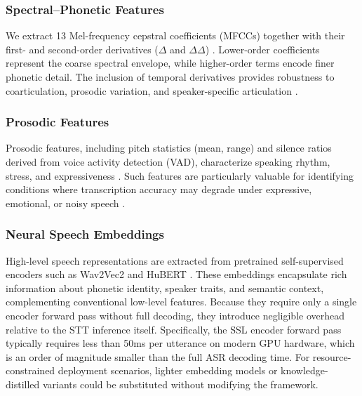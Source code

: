 \documentclass[journal]{IEEEtran}
\begin{document}
    \subsubsection{Spectral–Phonetic Features}
    We extract 13 Mel-frequency cepstral coefficients (MFCCs) together with their
    first- and second-order derivatives ($\Delta$ and $\Delta\Delta$)
    \cite{davis1980mfcc,furui1986deltas}. Lower-order coefficients represent the
    coarse spectral envelope, while higher-order terms encode finer phonetic
    detail. The inclusion of temporal derivatives provides robustness to coarticulation,
    prosodic variation, and speaker-specific articulation \cite{rabiner1993fundamentals}.

    \subsubsection{Prosodic Features}
    Prosodic features, including pitch statistics (mean, range) and silence ratios
    derived from voice activity detection (VAD), characterize speaking rhythm, stress,
    and expressiveness \cite{sohn1999vad}. Such features are particularly
    valuable for identifying conditions where transcription accuracy may degrade
    under expressive, emotional, or noisy speech \cite{li2023emotionalasr}.

    \subsubsection{Neural Speech Embeddings}
    High-level speech representations are extracted from pretrained self-supervised
    encoders such as Wav2Vec2 and HuBERT \cite{baevski2020wav2vec,hsu2021hubert}.
    These embeddings encapsulate rich information about phonetic identity, speaker
    traits, and semantic context, complementing conventional low-level features.
    Because they require only a single encoder forward pass without full
    decoding, they introduce negligible overhead relative to the STT inference itself.
    Specifically, the SSL encoder forward pass typically requires less than 50ms
    per utterance on modern GPU hardware, which is an order of magnitude smaller
    than the full ASR decoding time. For resource-constrained deployment scenarios,
    lighter embedding models or knowledge-distilled variants could be
    substituted without modifying the framework.
\end{document}

